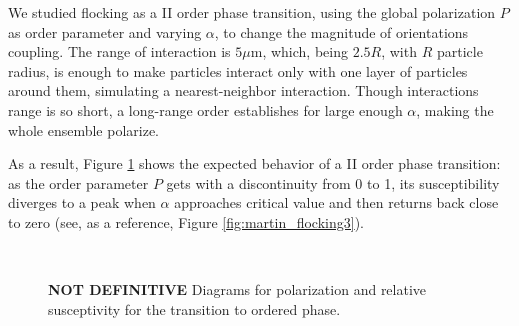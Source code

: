 \documentclass[../../master_thesis_np.tex]{subfiles}
\begin{document}
		We studied flocking as a II order phase transition, using the global polarization $P$ as order parameter and varying $\alpha$, to change the magnitude of orientations coupling. The range of interaction is $5 \mu \text{m}$, which, being $2.5R$, with $R$ particle radius, is enough to make particles interact only with one layer of particles around them, simulating a nearest-neighbor interaction. Though interactions range is so short, a long-range order establishes for large enough $\alpha$, making the whole ensemble polarize.
		
		As a result, Figure \ref{fig:phasetrans} shows the expected behavior of a II order phase transition: as the order parameter $P$ gets with a discontinuity from 0 to 1, its susceptibility diverges to a peak when $\alpha$ approaches critical value and then returns back close to zero (see, as a reference, Figure \ref{fig:martin_flocking3}).
		
		\begin{figure}[htp]
			\centering
			\\
			\caption{\textbf{NOT DEFINITIVE} Diagrams for polarization and relative susceptivity for the transition to ordered phase.}
			\label{fig:phasetrans}
		\end{figure}
		
\end{document}
